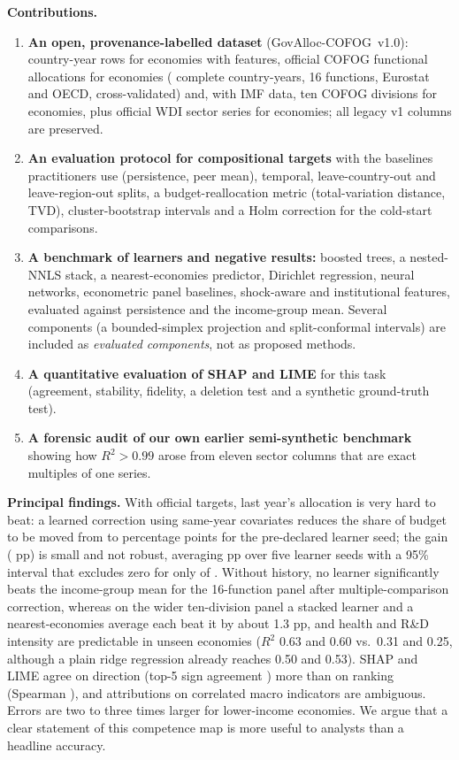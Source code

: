 \medskip\noindent\textbf{Contributions.}
\begin{enumerate}
\item \textbf{An open, provenance-labelled dataset} (GovAlloc-COFOG~v1.0): \NMasterRows{} country-year rows for \NMasterCountries{} economies with \NFeatNum{} features, official COFOG functional allocations for \NCofogCountries{} economies (\NCofogRows{} complete country-years, 16 functions, Eurostat and OECD, cross-validated) and, with IMF data, ten COFOG divisions for \NTenEcon{} economies, plus official WDI sector series for \NWdiCountries{} economies; all legacy v1 columns are preserved.
\item \textbf{An evaluation protocol for compositional targets} with the baselines practitioners use (persistence, peer mean), temporal, leave-country-out and leave-region-out splits, a budget-reallocation metric (total-variation distance, TVD), cluster-bootstrap intervals and a Holm correction for the cold-start comparisons.
\item \textbf{A benchmark of learners and negative results:} boosted trees, a nested-NNLS stack, a nearest-economies predictor, Dirichlet regression, neural networks, econometric panel baselines, shock-aware and institutional features, evaluated against persistence and the income-group mean. Several components (a bounded-simplex projection and split-conformal intervals) are included as \emph{evaluated components}, not as proposed methods.
\item \textbf{A quantitative evaluation of SHAP and LIME} for this task (agreement, stability, fidelity, a deletion test and a synthetic ground-truth test).
\item \textbf{A forensic audit of our own earlier semi-synthetic benchmark} showing how $R^2>0.99$ arose from eleven sector columns that are exact multiples of one series.
\end{enumerate}
\medskip\noindent\textbf{Principal findings.} With official targets, last year's allocation is very hard to beat: a learned correction using same-year covariates reduces the share of budget to be moved from \ResTVDPersist{} to \ResTVDHyb{} percentage points for the pre-declared learner seed; the gain (\ResPairedGain{} pp) is small and not robust, averaging \AnnSeedMeanGain{} pp over five learner seeds with a 95\% interval that excludes zero for only \AnnSeedNExcl{} of \AnnSeedN{}. Without history, no learner significantly beats the income-group mean for the 16-function panel after multiple-comparison correction, whereas on the wider ten-division panel a stacked learner and a nearest-economies average each beat it by about 1.3 pp, and health and R\&D intensity are predictable in unseen economies ($R^2$ 0.63 and 0.60 vs.\ 0.31 and 0.25, although a plain ridge regression already reaches 0.50 and 0.53). SHAP and LIME agree on direction (top-5 sign agreement \AgrSignMean) more than on ranking (Spearman \AgrRhoMean), and attributions on correlated macro indicators are ambiguous. Errors are two to three times larger for lower-income economies. We argue that a clear statement of this competence map is more useful to analysts than a headline accuracy.


